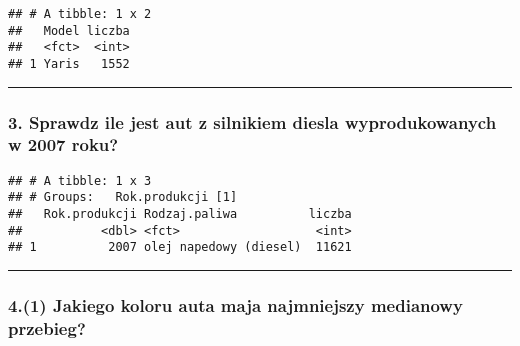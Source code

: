\documentclass[]{article}
\newenvironment{Shaded}{\begin{snugshade}}{\end{snugshade}}
\newcommand{\KeywordTok}[1]{\textcolor[rgb]{0.13,0.29,0.53}{\textbf{#1}}}
\newcommand{\DataTypeTok}[1]{\textcolor[rgb]{0.13,0.29,0.53}{#1}}
\newcommand{\DecValTok}[1]{\textcolor[rgb]{0.00,0.00,0.81}{#1}}
\newcommand{\StringTok}[1]{\textcolor[rgb]{0.31,0.60,0.02}{#1}}
\newcommand{\OtherTok}[1]{\textcolor[rgb]{0.56,0.35,0.01}{#1}}
\newcommand{\OperatorTok}[1]{\textcolor[rgb]{0.81,0.36,0.00}{\textbf{#1}}}
\newcommand{\NormalTok}[1]{#1}
\begin{document}
\begin{verbatim}
## # A tibble: 1 x 2
##   Model liczba
##   <fct>  <int>
## 1 Yaris   1552
\end{verbatim}

\begin{center}\rule{0.5\linewidth}{\linethickness}\end{center}

\subsubsection{3. Sprawdz ile jest aut z silnikiem diesla
wyprodukowanych w 2007
roku?}\label{sprawdz-ile-jest-aut-z-silnikiem-diesla-wyprodukowanych-w-2007-roku}

\begin{Shaded}
\end{Shaded}

\begin{verbatim}
## # A tibble: 1 x 3
## # Groups:   Rok.produkcji [1]
##   Rok.produkcji Rodzaj.paliwa          liczba
##           <dbl> <fct>                   <int>
## 1          2007 olej napedowy (diesel)  11621
\end{verbatim}

\begin{center}\rule{0.5\linewidth}{\linethickness}\end{center}

\subsubsection{4.(1) Jakiego koloru auta maja najmniejszy medianowy
przebieg?}\label{jakiego-koloru-auta-maja-najmniejszy-medianowy-przebieg}

\begin{Shaded}
\end{Shaded}
\end{document}
